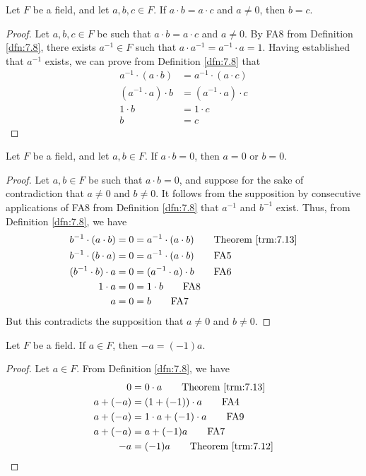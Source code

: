\documentclass[../main.tex]{subfiles}
\begin{document}
\begin{theorem}\label{trm:7.16}
    Let $F$ be a field, and let $a,b,c\in F$. If $a\cdot b=a\cdot c$ and $a\neq 0$, then $b=c$.
    \begin{proof}
        Let $a,b,c\in F$ be such that $a\cdot b=a\cdot c$ and $a\neq 0$. By FA8 from Definition \ref{dfn:7.8}, there exists $a^{-1}\in F$ such that $a\cdot a^{-1}=a^{-1}\cdot a=1$. Having established that $a^{-1}$ exists, we can prove from Definition \ref{dfn:7.8} that
        \begin{align*}
            a^{-1}\cdot(a\cdot b) &= a^{-1}\cdot(a\cdot c)\\
            (a^{-1}\cdot a)\cdot b &= (a^{-1}\cdot a)\cdot c\tag*{FA6}\\
            1\cdot b &= 1\cdot c\tag*{FA8}\\
            b &= c\tag*{FA7}
        \end{align*}
    \end{proof}
\end{theorem}

\begin{theorem}\label{trm:7.17}
    Let $F$ be a field, and let $a,b\in F$. If $a\cdot b=0$, then $a=0$ or $b=0$.
    \begin{proof}
        Let $a,b\in F$ be such that $a\cdot b=0$, and suppose for the sake of contradiction that $a\neq 0$ and $b\neq 0$. It follows from the supposition by consecutive applications of FA8 from Definition \ref{dfn:7.8} that $a^{-1}$ and $b^{-1}$ exist. Thus, from Definition \ref{dfn:7.8}, we have
        \begin{align*}
            b^{-1}\cdot(a\cdot b) &= 0 = a^{-1}\cdot(a\cdot b)\tag*{Theorem \ref{trm:7.13}}\\
            b^{-1}\cdot(b\cdot a) &= 0 = a^{-1}\cdot(a\cdot b)\tag*{FA5}\\
            (b^{-1}\cdot b)\cdot a &= 0 = (a^{-1}\cdot a)\cdot b\tag*{FA6}\\
            1\cdot a &= 0 = 1\cdot b\tag*{FA8}\\
            a &= 0 = b\tag*{FA7}
        \end{align*}
        But this contradicts the supposition that $a\neq 0$ and $b\neq 0$.
    \end{proof}
\end{theorem}
\pagebreak

\begin{lemma}\label{lem:7.18}
    Let $F$ be a field. If $a\in F$, then $-a=(-1)a$.
    \begin{proof}
        Let $a\in F$. From Definition \ref{dfn:7.8}, we have
        \begin{align*}
            0 &= 0\cdot a\tag*{Theorem \ref{trm:7.13}}\\
            a+(-a) &= (1+(-1))\cdot a\tag*{FA4}\\
            a+(-a) &= 1\cdot a+(-1)\cdot a\tag*{FA9}\\
            a+(-a) &= a+(-1)a\tag*{FA7}\\
            -a &= (-1)a\tag*{Theorem \ref{trm:7.12}}
        \end{align*}
    \end{proof}
\end{lemma}
\end{document}
